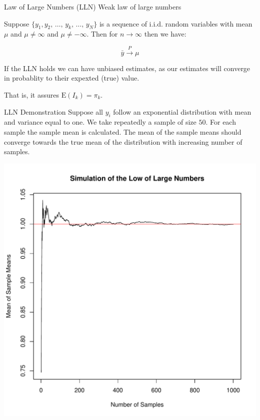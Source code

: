 \documentclass{beamer}\usepackage[]{graphicx}\usepackage[]{color}
\makeatletter
\def\maxwidth{ %
  \ifdim\Gin@nat@width>\linewidth
    \linewidth
  \else
    \Gin@nat@width
  \fi
}
\newenvironment{knitrout}{}{} %
\newcommand{\E}[1]{\text{E}\left(#1\right)}
\makeatother
\begin{document}
\begin{frame}{Law of Large Numbers (LLN)}
Weak law of large numbers

Suppose $ \{ y_1{,}y_2{,}\,\ldots{,}\,y_k{,}\,\ldots{,}\,y_N \}$ is a sequence of i.i.d. random variables with mean $\mu$ and $\mu \neq \infty$ and $\mu \neq -\infty$. Then for $n \rightarrow \infty$ then we have:

$$
\bar{y} \xrightarrow{P} \mu
$$

If the LLN holds we can have unbiased estimates, as our estimates will converge in probablity to their expexted (true) value.

That is, it assures $\E{I_k}=\pi_k$.
\end{frame}


\begin{frame}{LLN Demonstration}
Suppose all $y_i$ follow an exponential distribution with mean and variance equal to one. We take repeatedly a sample of size $50$. For each sample the sample mean is calculated. The mean of the sample means should converge towards the true mean of the distribution with increasing number of samples.
\begin{knitrout}
\color{fgcolor}

{\centering \includegraphics[width=\maxwidth]{figure/LLN-1} 

}



\end{knitrout}
\end{frame}
\end{document}
